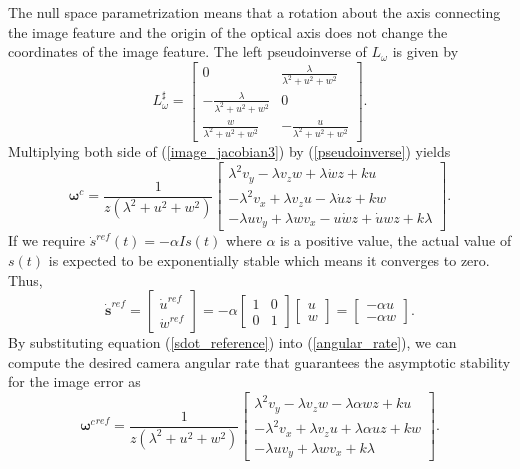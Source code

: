 The null space parametrization means that a rotation about the axis connecting the image feature and the origin of the optical axis does not change the coordinates of the image feature. The left pseudoinverse of $L_{\omega}$ is given by 
\begin{equation}
L_{\omega}^\sharp=\begin{bmatrix}
0 & \frac{\lambda}{\lambda^2+u^2+w^2} \\
-\frac{\lambda}{\lambda^2+u^2+w^2} & 0 \\
\frac{w}{\lambda^2+u^2+w^2} & -\frac{u}{\lambda^2+u^2+w^2}
\end{bmatrix}.
\label{pseudoinverse}
\end{equation}
Multiplying both side of (\ref{image_jacobian3}) by (\ref{pseudoinverse}) yields
\begin{equation}
\mathbf{\omega}^c=\frac{1}{z(\lambda^2+u^2+w^2)}\begin{bmatrix}
\lambda^2 v_y-\lambda v_z w+\lambda \dot{w}z+ku \\
-\lambda^2 v_x+\lambda v_zu-\lambda \dot{u}z+kw \\
-\lambda u v_y+\lambda w v_x-u\dot{w}z+\dot{u}wz+k\lambda
\end{bmatrix}.
\label{angular_rate}
\end{equation}
If we require $\dot{s}^{ref}(t)=-\alpha Is(t)$ where $\alpha$ is a positive value, the actual value of $s(t)$ is expected to be exponentially stable which means it converges to zero. Thus, 
\begin{equation}
\mathbf{\dot{s}}^{ref}=\begin{bmatrix}
\dot{u}^{ref} \\ \dot{w}^{ref}
\end{bmatrix}
=-\alpha \begin{bmatrix}
1 & 0 \\ 0 & 1
\end{bmatrix}
\begin{bmatrix}
u \\ w
\end{bmatrix}
=\begin{bmatrix}
-\alpha u \\ -\alpha w
\end{bmatrix}.
\label{sdot_reference}
\end{equation}
By substituting equation (\ref{sdot_reference}) into (\ref{angular_rate}), we can compute the desired camera angular rate that guarantees the asymptotic stability for the image error as
\begin{equation}
{\mathbf{\omega}^c}^{ref}=\frac{1}{z(\lambda^2+u^2+w^2)}\begin{bmatrix}
\lambda^2 v_y-\lambda v_z w -\lambda \alpha wz+ku \\
-\lambda^2 v_x+\lambda v_zu +\lambda \alpha uz+kw \\
-\lambda u v_y+\lambda w v_x +k\lambda
\end{bmatrix}.
\label{angular_rate_reference}
\end{equation}
